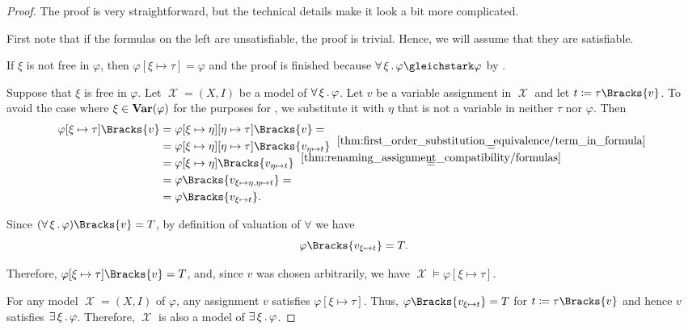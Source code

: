 \begin{proof}
  The proof is very straightforward, but the technical details make it look a bit more complicated.

  First note that if the formulas on the left are unsatisfiable, the proof is trivial. Hence, we will assume that they are satisfiable.

   If \( \xi \) is not free in \( \varphi \), then \( \varphi[\xi \mapsto \tau] = \varphi \) and the proof is finished because \( \qforall \xi \varphi \gleichstark \varphi \) by .

  Suppose that \( \xi \) is free in \( \varphi \). Let \( \mscrX = (X, I) \) be a model of \( \forall \thinspace \xi \thinspace . \thinspace \varphi \). Let \( v \) be a variable assignment in \( \mscrX \) and let \( t \coloneqq \tau\Bracks{v} \). To avoid the case where \( \xi \in \operatorname{\mathbf{Var}}(\varphi) \) for the purposes for , we substitute it with \( \eta \) that is not a variable in neither \( \tau \) nor \( \varphi \). Then
  \begin{align*}
    \varphi[\xi \mapsto \tau]\Bracks{v}
    &=
    \varphi[\xi \mapsto \eta][\eta \mapsto \tau]\Bracks{v}
    = \\ &=
    \varphi[\xi \mapsto \eta][\eta \mapsto \tau]\Bracks{v_{\eta \mapsto t}}
    \reloset {\ref{thm:first_order_substitution_equivalence/term_in_formula}} = \\ &=
    \varphi[\xi \mapsto \eta]\Bracks{v_{\eta \mapsto t}}
    \reloset {\ref{thm:renaming_assignment_compatibility/formulas}} = \\ &=
    \varphi\Bracks{v_{\xi \mapsto \eta, \eta \mapsto t}}
    = \\ &=
    \varphi\Bracks{v_{\xi \mapsto t}}.
  \end{align*}

  Since \( (\qforall \xi \varphi)\Bracks{v} = T \), by definition of valuation of \( \forall \) we have
  \begin{equation*}
    \varphi\Bracks{v_{\xi \mapsto t}} = T.
  \end{equation*}

  Therefore, \( \varphi[\xi \mapsto \tau]\Bracks{v} = T \), and, since \( v \) was chosen arbitrarily, we have \( \mscrX \vDash \varphi[\xi \mapsto \tau] \).

   For any model \( \mscrX = (X, I) \) of \( \varphi \), any assignment \( v \) satisfies \( \varphi[\xi \mapsto \tau] \). Thus, \( \varphi\Bracks{v_{\xi \mapsto t}} = T \) for \( t \coloneqq \tau\Bracks{v} \) and hence \( v \) satisfies \( \exists \thinspace \xi \thinspace . \thinspace \varphi \). Therefore, \( \mscrX \) is also a model of \( \exists \thinspace \xi \thinspace . \thinspace \varphi \).
\end{proof}

